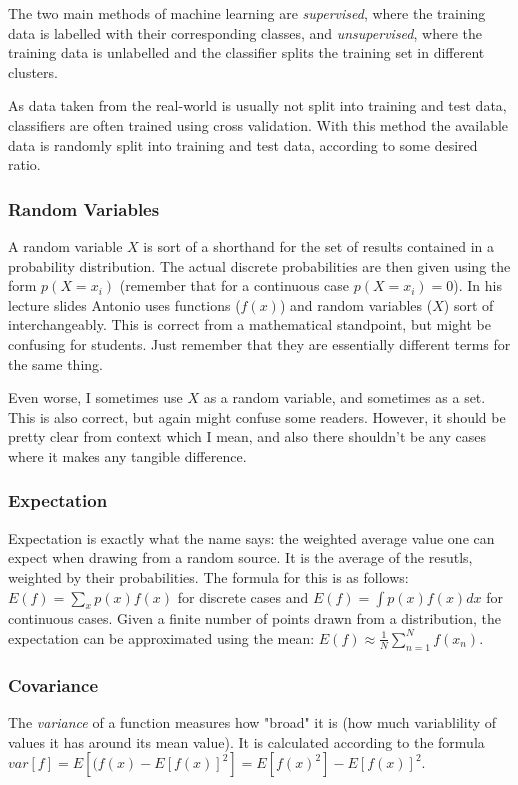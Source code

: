 \documentclass{article}
\begin{document}
The two main methods of machine learning are \emph{supervised}, where the training data is labelled with their corresponding classes, and \emph{unsupervised}, where the training data is unlabelled and the classifier splits the training set in different clusters.

As data taken from the real-world is usually not split into training and test data, classifiers are often trained using cross validation.
With this method the available data is randomly split into training and test data, according to some desired ratio.

\subsubsection{Random Variables}
A random variable $X$ is sort of a shorthand for the set of results contained in a probability distribution.
The actual discrete probabilities are then given using the form $p(X = x_i)$ (remember that for a continuous case $p(X = x_i) = 0$).
In his lecture slides Antonio uses functions ($f(x)$) and random variables ($X$) sort of interchangeably.
This is correct from a mathematical standpoint, but might be confusing for students.
Just remember that they are essentially different terms for the same thing.

Even worse, I sometimes use $X$ as a random variable, and sometimes as a set.
This is also correct, but again might confuse some readers.
However, it should be pretty clear from context which I mean, and also there shouldn't be any cases where it makes any tangible difference.

\subsubsection{Expectation}
Expectation is exactly what the name says: the weighted average value one can expect when drawing from a random source.
It is the average of the resutls, weighted by their probabilities.
The formula for this is as follows: $E(f) = \sum_x p(x) f(x)$ for discrete cases and $E(f) = \int p(x) f(x) dx$ for continuous cases.
Given a finite number of points drawn from a distribution, the expectation can be approximated using the mean: $E(f) \approx \frac{1}{N} \sum_{n=1}^N f(x_n)$.

\subsubsection{Covariance}
The \emph{variance} of a function measures how "broad" it is (how much variablility of values it has around its mean value).
It is calculated according to the formula $var[f] = E[(f(x) - E[f(x)]^2] = E[f(x)^2] - E[f(x)]^2$.
\end{document}
